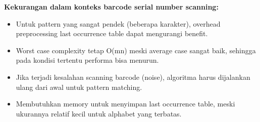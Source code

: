 \textbf{Kekurangan dalam konteks barcode serial number scanning:}
\begin{itemize}
    \item Untuk pattern yang sangat pendek (beberapa karakter), overhead preprocessing last occurrence table dapat mengurangi benefit.
    \item Worst case complexity tetap O(mn) meski average case sangat baik, sehingga pada kondisi tertentu performa bisa menurun.
    \item Jika terjadi kesalahan scanning barcode (noise), algoritma harus dijalankan ulang dari awal untuk pattern matching.
    \item Membutuhkan memory untuk menyimpan last occurrence table, meski ukurannya relatif kecil untuk alphabet yang terbatas.
\end{itemize}
